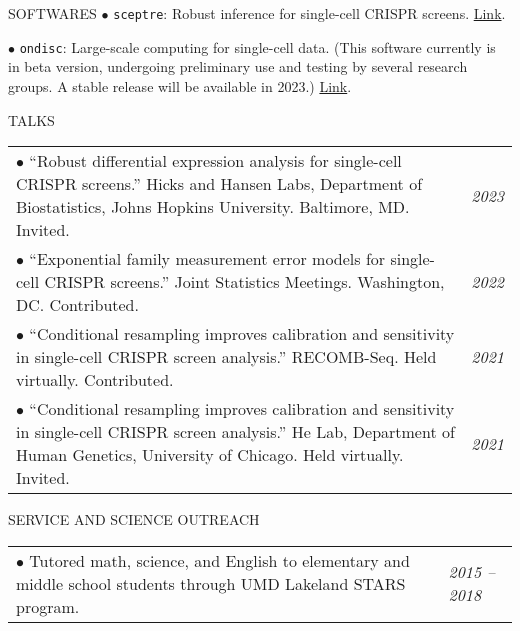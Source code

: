 \documentclass{resume} %
\begin{document}
\begin{rSection}{SOFTWARES}
	$\bullet$ \texttt{sceptre}: Robust inference for single-cell CRISPR screens. \href{https://katsevich-lab.github.io/sceptre/}{Link}.
	
	$\bullet$ \texttt{ondisc}: Large-scale computing for single-cell data. (This software currently is in beta version, undergoing preliminary use and testing by several research groups. A stable release will be available in 2023.) \href{https://github.com/timothy-barry/ondisc}{Link}.
\end{rSection}

\begin{rSection}{TALKS}
	
	\begin{tabular}{p{14cm}R{2.5cm}}
		$\bullet$ ``Robust differential expression analysis for single-cell CRISPR screens.'' Hicks and Hansen Labs, Department of Biostatistics, Johns Hopkins University. Baltimore, MD. Invited. & \it{2023} \\
		
		$\bullet$ ``Exponential family measurement error models for single-cell CRISPR screens.'' Joint Statistics Meetings. Washington, DC. Contributed.  & \it{2022} \\
		
		$\bullet$  ``Conditional resampling improves calibration and sensitivity in single-cell CRISPR screen analysis.'' RECOMB-Seq. Held virtually. Contributed. & \it{2021} \\
		
		$\bullet$ ``Conditional resampling improves calibration and sensitivity in single-cell CRISPR screen analysis.'' He Lab, Department of Human Genetics, University of Chicago. Held virtually. Invited. & \it{2021}
	\end{tabular}
	
\end{rSection}

\begin{rSection}{SERVICE AND SCIENCE OUTREACH}
	\begin{tabular}{p{14cm}R{2.5cm}}
		$\bullet$ Tutored math, science, and English to elementary and middle school students through UMD Lakeland STARS program. & \it{2015 -- 2018}  \\ 
	\end{tabular} 
\end{rSection}
\end{document}
